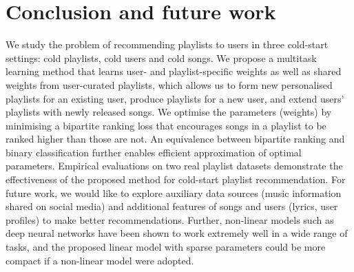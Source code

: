 \section{Conclusion and future work}

We study the problem of recommending playlists to users in three cold-start settings:
cold playlists, cold users and cold songs.
We propose a multitask learning method that learns user- and playlist-specific weights 
as well as shared weights from user-curated playlists,
which allows us to form new personalised playlists for an existing user, %
produce playlists for a new user, %
and extend users' playlists with newly released songs. %
We optimise the parameters (\ie weights) %
by minimising a bipartite ranking loss
that encourages songs in a playlist to be ranked higher than those are not.
An equivalence between bipartite ranking and binary classification further enables efficient 
approximation of optimal parameters.
Empirical evaluations on two real playlist datasets demonstrate the effectiveness of the proposed method 
for cold-start playlist recommendation.
%
%
For future work, we would like to explore 
auxiliary data sources (\eg music information shared on social media) and additional features of songs and users 
(\eg lyrics, user profiles) %
to make better recommendations.
Further, non-linear models such as deep neural networks have been shown to work extremely well in a wide range of tasks,
and the proposed linear model with sparse parameters %
could be more compact if a non-linear model %
were adopted.

